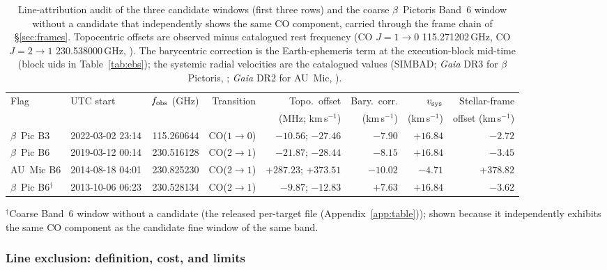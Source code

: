 \documentclass{openjournal}
\begin{document}
\begin{table}
\centering
\small
\caption{Line-attribution audit of the three candidate windows
(first three rows) and the coarse $\beta$~Pictoris Band~6 window
without a candidate
that independently shows the same CO component, carried through the
frame chain of \S\ref{sec:frames}. Topocentric offsets are observed
minus catalogued rest frequency (CO $J{=}1{\to}0$ 115.271202\,GHz,
CO $J{=}2{\to}1$ 230.538000\,GHz, \citealt{Pickett1998}). The
barycentric correction is the Earth-ephemeris term at the
execution-block mid-time (block uids in Table~\ref{tab:ebs}); the
systemic radial velocities are the catalogued values (SIMBAD;
\emph{Gaia} DR3 for $\beta$~Pictoris, \citealt{GaiaDR3}; \emph{Gaia}
DR2 for AU~Mic, \citealt{Fouque2018}).}
\label{tab:bpicaudit}
\begin{tabular}{@{}llrrrrrr@{}}
\toprule
Flag & UTC start & $f_{\rm obs}$ (GHz) &
Transition & Topo.\ offset & Bary.\ corr. & $v_{\rm sys}$ &
Stellar-frame \\
 & & & & (MHz; km\,s$^{-1}$) & (km\,s$^{-1}$) & (km\,s$^{-1}$) &
offset (km\,s$^{-1}$) \\
\midrule
$\beta$~Pic B3 & 2022-03-02 23:14 & 115.260644 &
CO($1{\to}0$) & $-10.56$; $-27.46$ & $-7.90$ & $+16.84$ & $-2.72$ \\
$\beta$~Pic B6 & 2019-03-12 00:14 & 230.516128 &
CO($2{\to}1$) & $-21.87$; $-28.44$ & $-8.15$ & $+16.84$ & $-3.45$ \\
AU~Mic B6 & 2014-08-18 04:01 & 230.825230 &
CO($2{\to}1$) & $+287.23$; $+373.51$ & $-10.02$ & $-4.71$ & $+378.82$ \\
$\beta$~Pic B6$^{\dagger}$ & 2013-10-06 06:23 & 230.528134 &
CO($2{\to}1$) & $-9.87$; $-12.83$ & $+7.63$ & $+16.84$ & $-3.62$ \\
\bottomrule
\end{tabular}
\parbox{\textwidth}{\footnotesize $^{\dagger}$Coarse
Band~6 window without a candidate (the released per-target file (Appendix~\ref{app:table})); shown
because it independently exhibits the same CO component as the
candidate fine window of the same band.}
\end{table}

\subsubsection*{Line exclusion: definition, cost, and limits}
\end{document}
